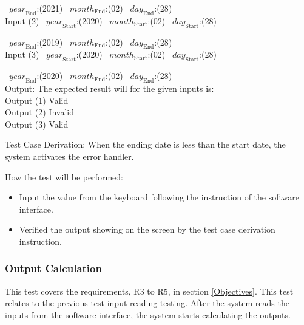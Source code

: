 \documentclass[12pt, titlepage]{article}
\begin{document}
\begin{enumerate}
~$\mathit{year}_\text{End}$:(2021)
~$\mathit{month}_\text{End}$:(02) ~$\mathit{day}_\text{End}$:(28)\\

Input (2) ~$\mathit{year}_\text{Start}$:(2020)
~$\mathit{month}_\text{Start}$:(02) ~$\mathit{day}_\text{Start}$:(28)

~$\mathit{year}_\text{End}$:(2019)
~$\mathit{month}_\text{End}$:(02) ~$\mathit{day}_\text{End}$:(28)\\

Input (3) ~$\mathit{year}_\text{Start}$:(2020)
~$\mathit{month}_\text{Start}$:(02) ~$\mathit{day}_\text{Start}$:(28)

~$\mathit{year}_\text{End}$:(2020)
~$\mathit{month}_\text{End}$:(02) ~$\mathit{day}_\text{End}$:(28)\\

Output: The expected result will for the given inputs is:\\ 
Output (1) Valid\\ 
Output (2) Invalid\\
Output (3) Valid\\ 


Test Case Derivation: When the ending date is less than the start date, the system
activates the error handler. \\



How the test will be performed: 

\begin{itemize} 
\item Input the value from the keyboard following the instruction of the
software interface. 
\item Verified the output showing on the screen by the test case derivation
instruction.
\end{itemize} 
\end{enumerate}

\subsubsection{Output Calculation}

This test covers the requirements, R3 to R5, in section \ref{Objectives}.
This test relates to the previous test input reading testing. After the 
system reads the inputs from the software interface, the system starts
calculating the outputs.
\end{document}
